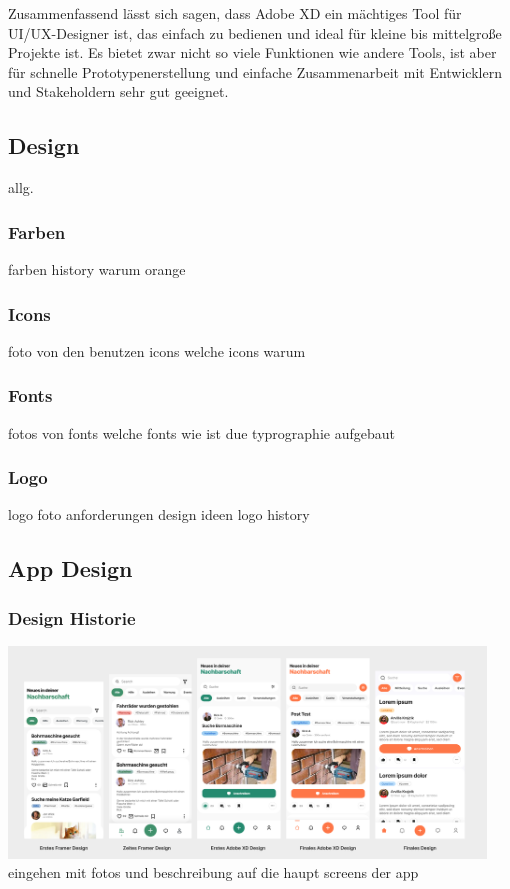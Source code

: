 Zusammenfassend lässt sich sagen, dass Adobe XD ein mächtiges Tool für UI/UX-Designer ist, das einfach zu bedienen und ideal für kleine bis mittelgroße Projekte ist. Es bietet zwar nicht so viele Funktionen wie andere Tools, ist aber für schnelle Prototypenerstellung und einfache Zusammenarbeit mit Entwicklern und Stakeholdern sehr gut geeignet.

\subsection{Design}
allg.


\subsubsection{Farben}
farben history
warum orange
\subsubsection{Icons}
foto von den benutzen icons
welche icons
warum
\subsubsection{Fonts}
fotos von fonts
welche fonts
wie ist due typrographie aufgebaut
\subsubsection{Logo}
logo foto
anforderungen
design ideen
logo history
\subsection{App Design}
\subsubsection{Design Historie}

\includegraphics[width=0.95\textwidth]{pics/app-design-history.png}
eingehen mit fotos und beschreibung auf die haupt screens der app

